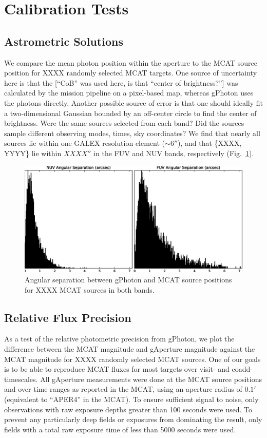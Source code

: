 \documentclass[5p]{elsarticle}
\begin{document}
\section{Calibration Tests}
\label{calibration}

\subsection{Astrometric Solutions}
We compare the mean photon position within the aperture to the MCAT source position for {\color{red}XXXX} randomly selected MCAT targets. One source of uncertainty here is that the {\color{red}[``CoB'' was used here, is that ``center of brightness?'']} was calculated by the mission pipeline on a pixel-based map, whereas gPhoton uses the photons directly. Another possible source of error is that one should ideally fit a two-dimensional Gaussian bounded by an off-center circle to find the center of brightness.  {\color{red}Were the same sources selected from each band?  Did the sources sample different observing modes, times, sky coordinates?}  We find that nearly all sources lie within one GALEX resolution element ($\sim 6''$), and that \{{\color{red}XXXX, YYYY}\} lie within {\color{red}$XXXX''$} in the FUV and NUV bands, respectively (Fig.\ \ref{fuvnuvastrometry}).

\begin{figure}
\includegraphics[scale=0.35]{FigAngSepFUVNUV.eps}
\caption{Angular separation between gPhoton and MCAT source positions for {\color{red}XXXX} MCAT sources in both bands. \label{fuvnuvastrometry}}
\end{figure}

\subsection{Relative Flux Precision}
As a test of the relative photometric precision from gPhoton, we plot the difference between the MCAT magnitude and gAperture magnitude against the MCAT magnitude for {\color{red}XXXX} randomly selected MCAT sources.  One of our goals is to be able to reproduce MCAT fluxes for most targets over visit- and coadd-timescales.  All gAperture measurements were done at the MCAT source positions and over time ranges as reported in the MCAT, using an aperture radius of $0.1'$ (equivalent to ``APER4'' in the MCAT). To ensure sufficient signal to noise, only observations with raw exposure depths greater than 100 seconds were used. To prevent any particularly deep fields or exposures from dominating the result, only fields with a total raw exposure time of less than 5000 seconds were used.
\end{document}
